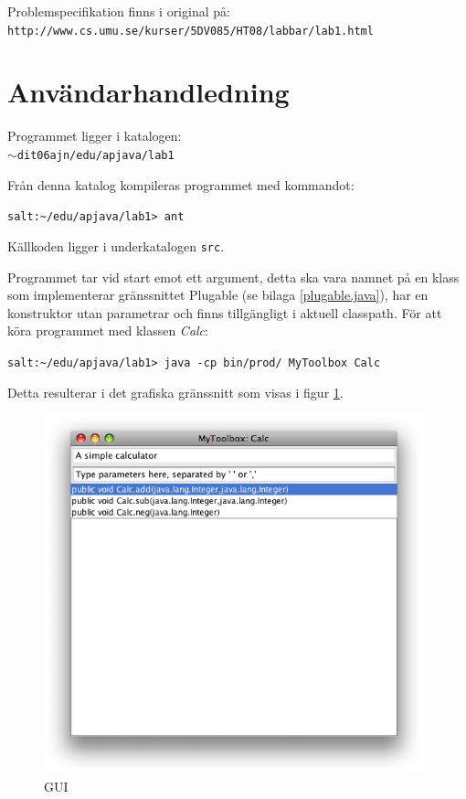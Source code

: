 \documentclass[a4paper, 12pt]{article}
\def\pathtocode{$\sim$dit06ajn/edu/apjava/lab1}
\begin{document}
Problemspecifikation finns i original på:\\
\verb!http://www.cs.umu.se/kurser/5DV085/HT08/labbar/lab1.html!

\section{Användarhandledning}
Programmet ligger i katalogen:\\
\texttt{\pathtocode}

Från denna katalog kompileras programmet med kommandot:

\verb!salt:~/edu/apjava/lab1> ant!

Källkoden ligger i underkatalogen \verb!src!.

Programmet tar vid start emot ett argument, detta ska vara namnet på
en klass som implementerar gränssnittet Plugable (se bilaga
\ref{plugable.java}), har en konstruktor utan parametrar och finns
tillgängligt i aktuell classpath. För att köra programmet med klassen
\textit{Calc}:

\verb!salt:~/edu/apjava/lab1> java -cp bin/prod/ MyToolbox Calc!

Detta resulterar i det grafiska gränssnitt som visas i figur
\ref{fig:gui}.

\begin{figure}[H]
  \begin{center}
    \includegraphics[width=110mm]{images/gui-out.png}
    \caption{GUI}
    \label{fig:gui}
  \end{center}
\end{figure}
\end{document}
